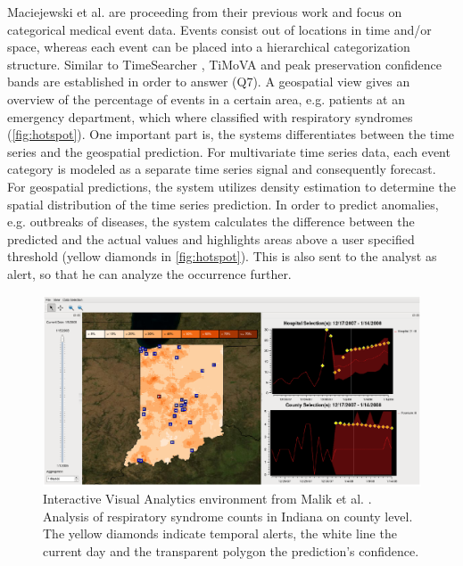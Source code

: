 \documentclass[electronic]{vgtc}             %
\begin{document}
Maciejewski et al. \cite{maciejewski:2011} are proceeding from their previous work \cite{maciejewski:2008, maciejewski:2007} and focus on categorical medical event data.
Events consist out of locations in time and/or space, whereas each event can be placed into a hierarchical categorization structure.
Similar to TimeSearcher \cite{Hochheiser:2004, buono:2005, buono:2007}, TiMoVA \cite{boegl:2014, boegl:2013} and peak preservation \cite{Hao:2009, Hao:2011, Hao:2012} confidence bands are established in order to answer (Q7).
A geospatial view gives an overview of the percentage of events in a certain area, e.g. patients at an emergency department, which where classified with respiratory syndromes (\autoref{fig:hotspot}).
One important part is, the systems differentiates between the time series and the geospatial prediction.
For multivariate time series data, each event category is modeled as a separate time series signal and consequently forecast. 
For geospatial predictions, the system utilizes density estimation to determine the spatial distribution of the time series prediction. 
In order to predict anomalies, e.g. outbreaks of diseases, the system calculates the difference between the predicted and the actual values and highlights areas above a user specified threshold (yellow diamonds in \autoref{fig:hotspot}).
This is also sent to the analyst as alert, so that he can analyze the occurrence further.

\begin{figure}[htb]
	\centering
	\includegraphics[width=\columnwidth]{Hotspot}
	\caption{Interactive Visual Analytics environment from Malik et al. \cite{maciejewski:2011}. 
		Analysis of respiratory syndrome counts in Indiana on county level. The yellow diamonds indicate temporal alerts, the white line the current day and the transparent polygon the prediction's confidence.
	}
	\label{fig:hotspot}
\end{figure}
\end{document}
